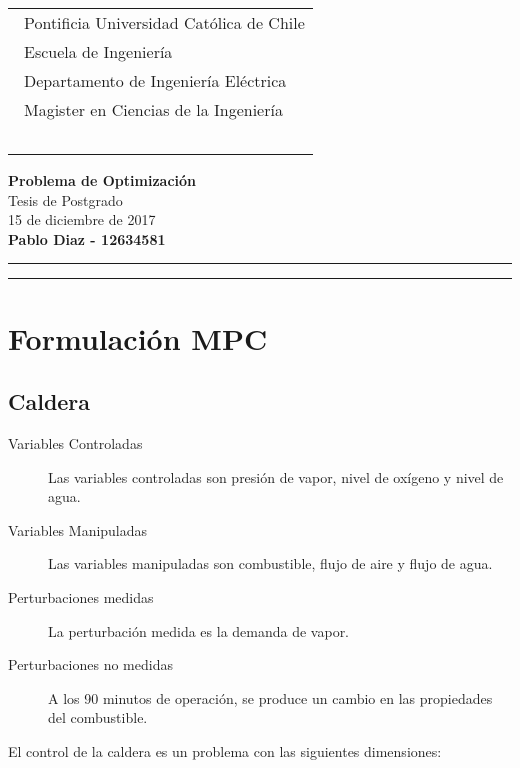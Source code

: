 \documentclass{article}
\begin{document}
\thispagestyle{empty}


\hspace*{2cm}
 \begin{tabular}{l}
  {\ Pontificia Universidad Católica de Chile}\\
  {\ Escuela de Ingeniería}\\
  {\ Departamento de Ingeniería Eléctrica}\\
  {\ Magister en Ciencias de la Ingeniería }\\
  {\  }\\
 \end{tabular}
 \hfill 
\vspace*{-0.2cm}
\begin{center}
{\Large\bf Problema de Optimización}\\
\vspace*{2mm}
{\Large Tesis de Postgrado}\\
{15 de diciembre de 2017}\\
\vspace*{1mm}
{\bf Pablo Diaz - 12634581 }\\
\vspace*{1mm}
\end{center}
\hrule\vspace*{2pt}\hrule
\setcounter{page}{1}

\section{Formulación MPC}
\subsection{Caldera}
\begin{description}
\item[Variables Controladas] Las variables controladas son presión de vapor, nivel de oxígeno y nivel de agua.
\item[Variables Manipuladas] Las variables manipuladas son combustible, flujo de aire y flujo de agua.
\item[Perturbaciones medidas] La perturbación medida es la demanda de vapor.
\item[Perturbaciones no medidas] A los 90 minutos de operación, se produce un cambio en las propiedades del combustible.

\end{description}
El control de la caldera es un problema con las siguientes dimensiones:
\end{document}
